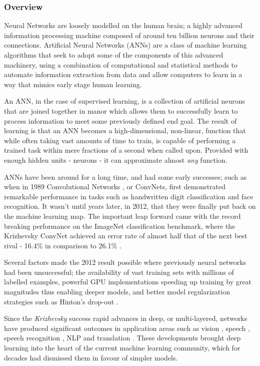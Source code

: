 \documentclass[a4paper,11pt,titlepage]{article}
\begin{document}
	\subsubsection{Overview}
	Neural Networks are loosely modelled on the human brain; a highly advanced information processing machine composed of around ten billion neurons and their connections. Artificial Neural Networks (ANNs) are a class of machine learning algorithms that seek to adopt some of the components of this advanced machinery, using a combination of computational and statistical methods to automate information extraction from data and allow computers to learn in a way that mimics early stage human learning.
			\par 
			An ANN, in the case of supervised learning, is a collection of artificial neurons that are joined together in manor which allows them to successfully learn to process information to meet some previously defined end goal. The result of learning is that an ANN becomes a high-dimensional, non-linear, function that while often taking vast amounts of time to train, is capable of performing a trained task within mere fractions of a second when called upon. Provided with enough hidden units - neurons - it can approximate almost \textit{any} function. 
			\par
			ANNs have been around for a long time, and had some early successes; such as when in 1989 Convolutional Networks \cite{LeCun1989}, or ConvNets, first demonstrated remarkable performance in tasks such as handwritten digit classification and face recognition. It wasn't until years later, in 2012, that they were finally put back on the machine learning map. The important leap forward came with the record breaking performance on the ImageNet classification benchmark, where the Krizhevsky ConvNet achieved an error rate of almost half that of the next best rival - 16.4\% in comparison to 26.1\% \cite{Krizhevsky2012}.
			\par
			Several factors made the 2012 result possible where previously neural networks had been unsuccessful; the availability of vast training sets with millions of labelled examples, powerful GPU implementations speeding up training by great magnitudes thus enabling deeper models, and better model regularization strategies such as Hinton's drop-out \cite{Hinton2012}.
			\par 
			Since the \textit{Krizhevsky} success rapid advances in deep, or multi-layered, networks have produced significant outcomes in application areas such as vision \cite{Russakovsky2015}, speech \cite{Sutskever2014}, speech recognition \cite{Sainath2015}, NLP \cite{Norouzi2014} and  translation \cite{Graves2014}. These developments brought deep learning into the heart of the current machine learning community, which for decades had dismissed them in favour of simpler models.
			
\end{document}
